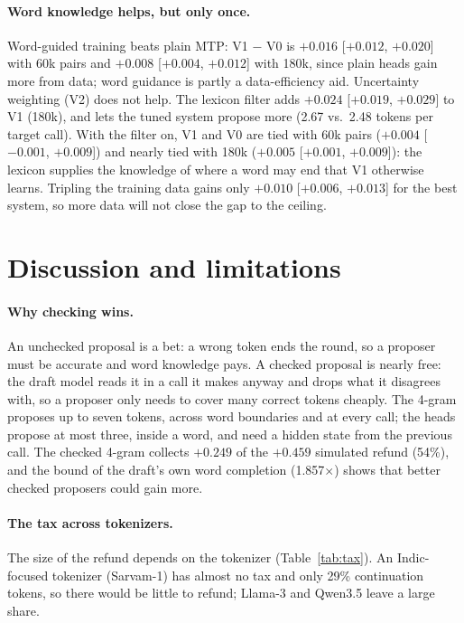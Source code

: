 \documentclass[11pt]{article}
\newcommand{\x}{$\times$}
\begin{document}
\paragraph{Word knowledge helps, but only once.} Word-guided training beats plain MTP: V1 $-$ V0 is
$+0.016$ [$+0.012$, $+0.020$] with 60k pairs and $+0.008$ [$+0.004$, $+0.012$] with 180k, since plain
heads gain more from data; word guidance is partly a data-efficiency aid. Uncertainty weighting (V2)
does not help. The lexicon filter adds $+0.024$ [$+0.019$, $+0.029$] to V1 (180k), and lets the tuned
system propose more (2.67 vs.\ 2.48 tokens per target call). With the filter on, V1 and V0 are tied
with 60k pairs ($+0.004$ [$-0.001$, $+0.009$]) and nearly tied with 180k ($+0.005$ [$+0.001$, $+0.009$]):
the lexicon supplies the knowledge of where a word may end that V1 otherwise learns. Tripling the
training data gains only $+0.010$ [$+0.006$, $+0.013$] for the best system, so more data will not close
the gap to the ceiling.




\section{Discussion and limitations}

\paragraph{Why checking wins.} An unchecked proposal is a bet: a wrong token ends the round, so a
proposer must be accurate and word knowledge pays. A checked proposal is nearly free: the draft model
reads it in a call it makes anyway and drops what it disagrees with, so a proposer only needs to cover
many correct tokens cheaply. The 4-gram proposes up to seven tokens, across word boundaries and at
every call; the heads propose at most three, inside a word, and need a hidden state from the previous
call. The checked 4-gram collects $+0.249$ of the $+0.459$ simulated refund (54\%), and the bound of the
draft's own word completion (1.857\x) shows that better checked proposers could gain more.

\paragraph{The tax across tokenizers.} The size of the refund depends on the tokenizer
(Table~\ref{tab:tax}). An Indic-focused tokenizer (Sarvam-1) has almost no tax and only 29\%
continuation tokens, so there would be little to refund; Llama-3 and Qwen3.5 leave a large share.
\end{document}
